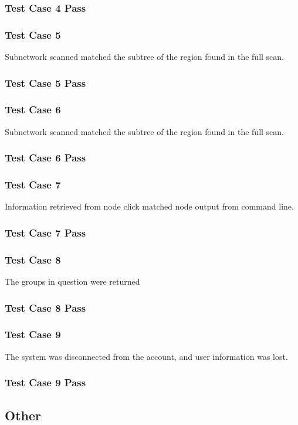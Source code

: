 \documentclass[hidelinks,a4paper,12pt]{article}
\begin{document}
\subsubsection{Test Case 4 Pass}
\subsubsection{Test Case 5}
Subnetwork scanned matched the subtree of the region found in the full scan.
\subsubsection{Test Case 5 Pass}
\subsubsection{Test Case 6}
Subnetwork scanned matched the subtree of the region found in the full scan.
\subsubsection{Test Case 6 Pass}
\subsubsection{Test Case 7}
Information retrieved from node click matched node output from command line.
\subsubsection{Test Case 7 Pass}
\subsubsection{Test Case 8}
The groups in question were returned
\subsubsection{Test Case 8 Pass}
\subsubsection{Test Case 9}
The system was disconnected from the account, and user information was lost.
\subsubsection{Test Case 9 Pass}

\subsection{Other}
\end{document}
